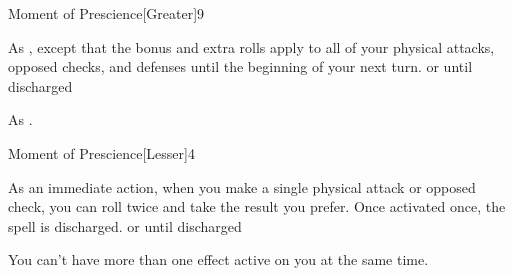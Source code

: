\begin{spellsection}{Moment of Prescience}[Greater]{9}
\begin{spellheader}
\end{spellheader}
\begin{spellcontent}
    \begin{spelltargetinginfo}
    \end{spelltargetinginfo}
    \begin{spelleffects}
        \spelleffect As , except that the bonus and extra rolls apply to all of your physical attacks, opposed checks, and defenses until the beginning of your next turn.
        \spelldur \durext or until discharged
    \end{spelleffects}
\end{spellcontent}
\begin{spellfooter}
    \spellnotes As .
\end{spellfooter}
\end{spellsection}

\begin{spellsection}{Moment of Prescience}[Lesser]{4}
\begin{spellheader}
\end{spellheader}
\begin{spellcontent}
    \begin{spelltargetinginfo}
    \end{spelltargetinginfo}
    \begin{spelleffects}
        \spelleffect As an immediate action, when you make a single physical attack or opposed check, you can roll twice and take the result you prefer. Once activated once, the spell is discharged.
        \spelldur \durext or until discharged
    \end{spelleffects}
\end{spellcontent}
\begin{spellfooter}
    \spellnotes You can't have more than one  effect active on you at the same time.
\end{spellfooter}

\begin{comment}
\subsubsection{O-P}
\end{comment}
\end{spellsection}

